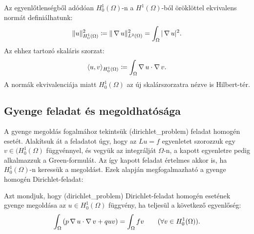 \begin{corollary}
	Az egyenlőtlenségből adódóan $H_0^1(\Omega)$-n a $H^1(\Omega)$-ból öröklöttel ekvivalens normát definiálhatunk:
	\begin{equation*}
		\| u \|_{H^1_0(\Omega)}^2 \coloneqq  \| \operatorname{\nabla} u \|_{L^2(\Omega)}^2 = \int_{\Omega} |\operatorname{\nabla} u|^2.
	\end{equation*}
	 Az ehhez tartozó skaláris szorzat:
	\begin{equation*}
		\langle u, v \rangle_{H^1_0(\Omega)} \coloneqq \int_{\Omega}  \operatorname{\nabla} u \cdot \operatorname{\nabla} v.
	\end{equation*}
	 A normák ekvivalenciája miatt $H_0^1(\Omega)$ az új skalárszorzatra nézve is Hilbert-tér.
\end{corollary}



\subsection{Gyenge feladat és megoldhatósága}

A gyenge megoldás fogalmához tekintsük \aref({dirichlet_problem})  feladat homogén esetét. Alakítsuk át a feladatot úgy, hogy az  $Lu = f$ egyenletet szorozzuk egy  $v \in (H_0^1(\Omega)$ függvénnyel, és vegyük az integrálját $\Omega$-n, a kapott egyenletre pedig alkalmazzuk a Green-formulát. Az így kapott feladat értelmes akkor is, ha $H^1_0(\Omega)$-n keressük a megoldást. Ezek alapján megfogalmazható a gyenge homogén Dirichlet-feladat:

\begin{definition}
	 Azt mondjuk, hogy \aref({dirichlet_problem}) Dirichlet-feladat homogén esetének gyenge megoldása  az $u\in H^1_0(\Omega)$ függvény, ha teljesül a következő egyenlőség: 
	\begin{equation}\label{gyenge_fealdat}
		\int_{\Omega} \left( p \operatorname{\nabla} u \cdot \operatorname{\nabla} v + q u v \right) = \int_{\Omega} f v  \qquad (\forall v \in H^1_0(\Omega)).
	\end{equation} 
\end{definition}

